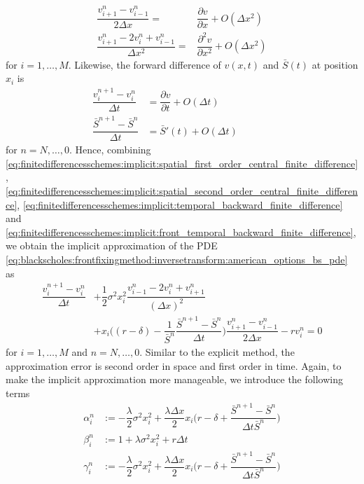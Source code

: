 \begin{align}
  \label{eq:finitedifferencesschemes:implicit:spatial_first_order_central_finite_difference}
  \dfrac{v^{n}_{i+1} - v^{n}_{i-1}}{2 \Delta{x}} =& \dfrac{\partial{v}}{\partial{x}}+ O(\Delta{x}^2) \\
  \label{eq:finitedifferencesschemes:implicit:spatial_second_order_central_finite_difference}
  \dfrac{v^{n}_{i+1} - 2v^{n}_{i} + v^{n}_{i-1}}{\Delta{x}^2} =& \dfrac{\partial^2{v}}{\partial{x^2}}+ O(\Delta{x}^2)
\end{align}
for $i = 1, \dots, M$. Likewise, the forward difference of $v(x, t)$ and $\bar{S}(t)$ at position $x_i$ is  
\begin{align}
  \label{eq:finitedifferencesschemes:implicit:temporal_backward_finite_difference}
  \dfrac{v^{n+1}_{i} - v^{n}_{i}}{\Delta{t}} &= \dfrac{\partial{v}}{\partial{t}}+ O(\Delta{t}) \\
  \label{eq:finitedifferencesschemes:implicit:front_temporal_backward_finite_difference}
  \dfrac{\bar{S}^{n+1}-\bar{S}^{n}}{\Delta t} &= \bar{S}'(t) + O(\Delta{t}) \qquad & \text{ }
\end{align}
for $n = N,\dots,0$. Hence, combining \eqref{eq:finitedifferencesschemes:implicit:spatial_first_order_central_finite_difference}, \eqref{eq:finitedifferencesschemes:implicit:spatial_second_order_central_finite_difference}, \eqref{eq:finitedifferencesschemes:implicit:temporal_backward_finite_difference} and \eqref{eq:finitedifferencesschemes:implicit:front_temporal_backward_finite_difference},we obtain the implicit approximation of the PDE \eqref{eq:blackscholes:frontfixingmethod:inversetransform:american_options_bs_pde} as
\begin{equation*}
  \begin{split}
    \dfrac{v^{n+1}_{i} - v^{n}_{i}}{\Delta{t}} & + \dfrac{1}{2}\sigma^2 x_i^2 \dfrac{v^{n}_{i-1} - 2v^{n}_{i} + v^{n}_{i+1}}{(\Delta{x})^2} \\ 
     & + x_i\bigg( (r-\delta) - \dfrac{1}{\bar{S}^{n}}\dfrac{\bar{S}^{n+1} - \bar{S}^{n}}{\Delta{t}} \bigg)\dfrac{v^{n}_{i+1} - v^{n}_{i-1}}{2\Delta{x}} - rv^{n}_{i} = 0
  \end{split}
\end{equation*}
for $i=1,\dots,M$ and $n=N,\dots,0$. Similar to the explicit method, the approximation error is second order in space and first order in time. Again, to make the implicit  approximation more manageable, we introduce the following terms  
\begin{align}
  \alpha^{n}_{i} &:= -\dfrac{\lambda}{2}\sigma^2x^{2}_{i} + \dfrac{\lambda\Delta{x}}{2}x_{i}\bigg(r-\delta+\dfrac{\bar{S}^{n+1}-\bar{S}^n}{\Delta{t}\bar{S}^{n}}\bigg) \\
  \beta^{n}_{i} &:= 1 + \lambda\sigma^2x^{2}_{i} + r\Delta{t} \\
  \gamma^{n}_{i} &:= -\dfrac{\lambda}{2}\sigma^2x^{2}_{i} + \dfrac{\lambda\Delta{x}}{2}x_{i}\bigg(r-\delta+\dfrac{\bar{S}^{n+1}-\bar{S}^n}{\Delta{t}\bar{S}^{n}}\bigg)
\end{align}
